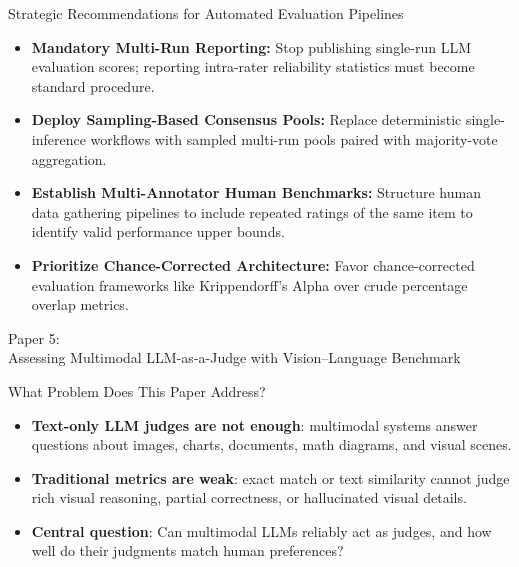 \documentclass[10pt]{beamer}
\begin{document}
\begin{frame}{Strategic Recommendations for Automated Evaluation Pipelines}
  \begin{itemize}
    \item \textbf{Mandatory Multi-Run Reporting:} Stop publishing single-run LLM evaluation scores; reporting intra-rater reliability statistics must become standard procedure.
    \item \textbf{Deploy Sampling-Based Consensus Pools:} Replace deterministic single-inference workflows with sampled multi-run pools paired with majority-vote aggregation.
    \item \textbf{Establish Multi-Annotator Human Benchmarks:} Structure human data gathering pipelines to include repeated ratings of the same item to identify valid performance upper bounds.
    \item \textbf{Prioritize Chance-Corrected Architecture:} Favor chance-corrected evaluation frameworks like Krippendorff's Alpha over crude percentage overlap metrics.
  \end{itemize}
\end{frame}






\begin{frame}[standout]
  \hypertarget{paper5}{}
  \Large Paper 5:\\Assessing Multimodal LLM-as-a-Judge with Vision--Language Benchmark
\end{frame}


\begin{frame}{What Problem Does This Paper Address?}
  \begin{itemize}
    \item \textbf{Text-only LLM judges are not enough}: multimodal systems answer questions about images, charts, documents, math diagrams, and visual scenes.
    \item \textbf{Traditional metrics are weak}: exact match or text similarity cannot judge rich visual reasoning, partial correctness, or hallucinated visual details.
    \item \textbf{Central question}: Can multimodal LLMs reliably act as judges, and how well do their judgments match human preferences?
  \end{itemize}
\end{frame}
\end{document}
